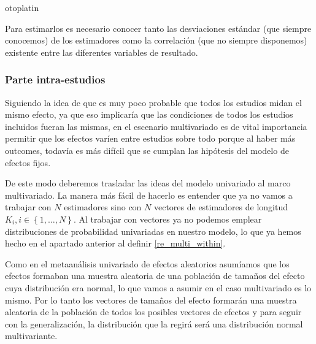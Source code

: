 otoplatin\documentclass[a4paper,openright,12pt]{report}
\begin{document}
Para estimarlos es necesario conocer tanto las desviaciones estándar (que siempre conocemos) de los estimadores como la correlación (que no siempre disponemos) existente entre las diferentes variables de resultado.
\subsubsection{Parte intra-estudios}
Siguiendo la idea de que es muy poco probable que todos los estudios midan el mismo efecto, ya que eso implicaría que las condiciones de todos los estudios incluidos fueran las mismas, en el escenario multivariado es de vital importancia permitir que los efectos varíen entre estudios sobre todo porque al haber más outcomes, todavía es más difícil que se cumplan las hipótesis del modelo de efectos fijos.

De este modo deberemos trasladar las ideas del modelo univariado al marco multivariado. La manera más fácil de hacerlo es entender que ya no vamos a trabajar con $N$ estimadores sino con 
$N$ vectores de estimadores de longitud $K_{i}, i \in \left\lbrace 1, \ldots, N \right\rbrace$. Al trabajar con vectores ya no podemos emplear distribuciones de probabilidad univariadas en nuestro modelo, lo que ya hemos hecho en el apartado anterior al definir \ref{re_multi_within}. 

Como en el metaanálisis univariado de efectos aleatorios asumíamos que los efectos formaban una muestra aleatoria de una población de tamaños del efecto cuya distribución era normal, lo que vamos a asumir en el caso multivariado es lo mismo. Por lo tanto los vectores de tamaños del efecto formarán una muestra aleatoria de la población de todos los posibles vectores de efectos y para seguir con la generalización, la distribución que la regirá será una distribución normal multivariante. 
\end{document}
